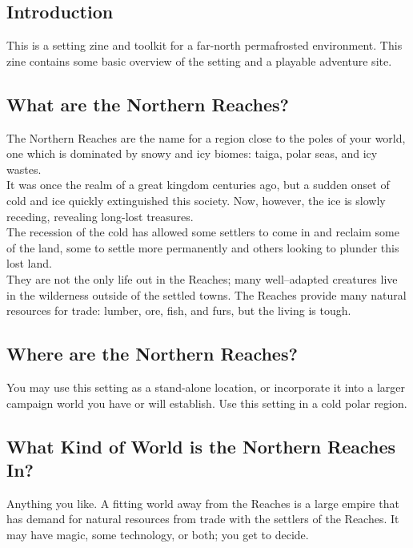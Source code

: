 \documentclass[notitlepage]{article}
\begin{document}
\begin{multicols}{2}
  
\section{Introduction}

This is a setting zine and toolkit for a far-north permafrosted environment. This zine contains some basic overview of the setting and a playable adventure site.

\subsection*{What are the Northern Reaches?}

The Northern Reaches are the name for a region close to the poles of your world, one which is dominated by snowy and icy biomes: taiga, polar seas, and icy wastes. \\

It was once the realm of a great kingdom centuries ago, but a sudden onset of cold and ice quickly extinguished this society.
Now, however, the ice is slowly receding, revealing long-lost treasures. \\

The recession of the cold has allowed some settlers to come in and reclaim some of the land, some to settle more permanently and others looking to plunder this lost land. \\

They are not the only life out in the Reaches; many well--adapted creatures live in the wilderness outside of the settled towns.
The Reaches provide many natural resources for trade: lumber, ore, fish, and furs, but the living is tough.

\subsection*{Where are the Northern Reaches?}

You may use this setting as a stand-alone location, or incorporate it into a larger campaign world you have or will establish.
Use this setting in a cold polar region.

\subsection*{What Kind of World is the Northern Reaches In?}

Anything you like.
A fitting world away from the Reaches is a large empire that has demand for natural resources from trade with the settlers of the Reaches.
It may have magic, some technology, or both; you get to decide. \\


\end{multicols}
\end{document}
